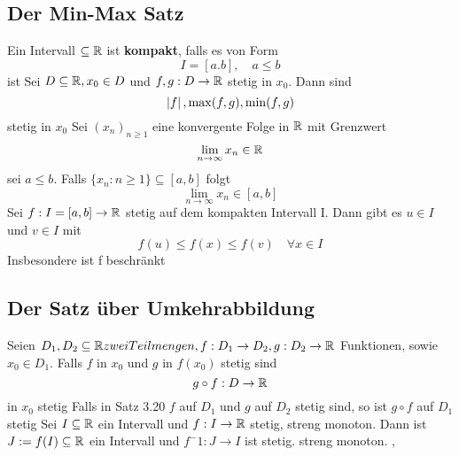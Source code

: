 \subsection{Der Min-Max Satz}
 Ein Intervall \(\subseteq \mathbb{R}\) ist \textbf{kompakt}, falls es von Form
\[I = [a.b], \quad a \leq b\] ist \newline
{} Sei \(D \subseteq \mathbb{R}, x_0 \in D \) und \(f,g : D \rightarrow \mathbb{R} \) stetig in \(x_0\). Dann sind
\[ \left\lvert f \right\rvert, \max(f,g), \min(f,g) \] stetig in \(x_0\) \newline
{} Sei \((x_n)_{n \geq 1}\) eine konvergente Folge in \(\mathbb{R}\) mit Grenzwert
\[\lim\limits_{n \rightarrow \infty} x_n \in \mathbb{R} \]
sei \(a \leq b\). Falls \(\{x_n : n \geq 1\} \subseteq [a,b]\) folgt
\[\lim\limits_{n \rightarrow \infty} x_n \in [a,b] \]
 Sei \(f : I = [a,b] \rightarrow \mathbb{R} \) stetig auf dem kompakten Intervall I. Dann gibt es \(u \in I \) und \(v \in I\) mit
\[f(u) \leq f(x) \leq f(v) \quad \forall x \in I\]
Insbesondere ist f beschränkt
\subsection{Der Satz über  Umkehrabbildung} 
 Seien \(D_1, D_2 \subseteq \mathbb{R} zwei Teilmengen, f: D_1 \rightarrow D_2, g: D_2 \rightarrow \mathbb{R}\) Funktionen, sowie \(x_0 \in D_1\). Falls \(f\) in \(x_0\) und \(g\) in \(f(x_0)\) stetig sind
\[ g \circ f : D \rightarrow \mathbb{R} \]
in \(x_0\) stetig \newline
{} Falls in Satz 3.20 \(f\) auf \(D_1\) und \(g\) auf \(D_2\) stetig sind, so ist \(g \circ f\) auf \(D_1\) stetig \newline
{} Sei \(I \subseteq \mathbb{R}\) ein Intervall und \(f: I \rightarrow \mathbb{R}\) stetig, streng monoton. Dann ist \(J:= f(I) \subseteq \mathbb{R}\) ein Intervall und \(f^-1 : J \rightarrow I \) ist stetig. streng monoton.
\sep
